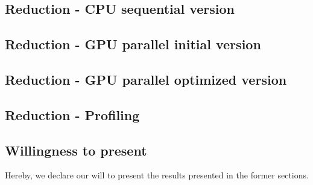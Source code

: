 \documentclass[12pt]{article}
\begin{document}
\vspace{10pt}

\subsection{Reduction - CPU sequential version}

\subsection{Reduction - GPU parallel initial version}

\subsection{Reduction - GPU parallel optimized version}

\subsection{Reduction - Profiling}

\subsection{Willingness to present}
Hereby, we declare our will to present the results presented in the former sections.
\end{document}
